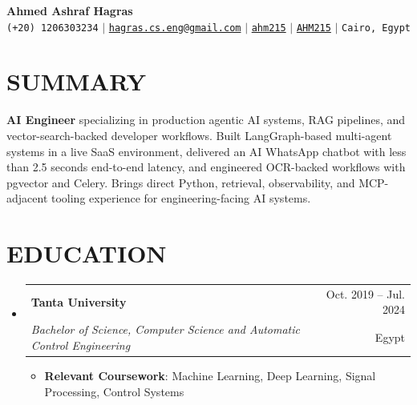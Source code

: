 \documentclass[letterpaper,11pt]{article}
\makeatletter
\newcommand{\resumeItem}[1]{
  \item\small{
    {#1 \vspace{-1pt}}
  }
}
\newcommand{\resumeSubheading}[4]{
  \vspace{-1pt}\item
    \begin{tabular*}{\textwidth}[t]{l@{\extracolsep{\fill}}r}
      \textbf{#1} & {\color{dark-grey}\small #2}\vspace{1pt}\\
      \textit{#3} & {\color{dark-grey} \small #4}\\
    \end{tabular*}\vspace{-4pt}
}
\newcommand{\resumeSubHeadingListStart}{\begin{itemize}[leftmargin=0in, label={}]}
\newcommand{\resumeSubHeadingListEnd}{\end{itemize}}
\newcommand{\resumeItemListStart}{\begin{itemize}}
\newcommand{\resumeItemListEnd}{\end{itemize}\vspace{0pt}}
\makeatother
\begin{document}
\begin{center}
    \textbf{\Huge Ahmed Ashraf Hagras} \\ \vspace{5pt}
    \small \faPhone* \texttt{(+20) 1206303234} \hspace{1pt} $|$
    \hspace{1pt} \faEnvelope \hspace{2pt} \href{mailto:hagras.cs.eng@gmail.com}{\texttt{hagras.cs.eng@gmail.com}} \hspace{1pt} $|$
    \hspace{1pt} \faLinkedin \hspace{2pt} \href{https://www.linkedin.com/in/ahm215}{\texttt{ahm215}} \hspace{1pt} $|$
    \hspace{1pt} \faGithub \hspace{2pt} \href{https://github.com/AHM215}{\texttt{AHM215}} \hspace{1pt} $|$
    \hspace{1pt} \faMapMarker* \hspace{2pt}\texttt{Cairo, Egypt}
    \\ \vspace{-3pt}
\end{center}

\section{SUMMARY}
\small{
\textbf{AI Engineer} specializing in production agentic AI systems, RAG pipelines, and vector-search-backed developer workflows. Built LangGraph-based multi-agent systems in a live SaaS environment, delivered an AI WhatsApp chatbot with less than 2.5 seconds end-to-end latency, and engineered OCR-backed workflows with pgvector and Celery. Brings direct Python, retrieval, observability, and MCP-adjacent tooling experience for engineering-facing AI systems.
}

\section{EDUCATION}
  \resumeSubHeadingListStart
    \resumeSubheading
      {Tanta University}{Oct. 2019 -- Jul. 2024}
      {Bachelor of Science, Computer Science and Automatic Control Engineering}{Egypt}
      \resumeItemListStart
        \resumeItem{\textbf{Relevant Coursework}: Machine Learning, Deep Learning, Signal Processing, Control Systems}
      \resumeItemListEnd
  \resumeSubHeadingListEnd
\end{document}
